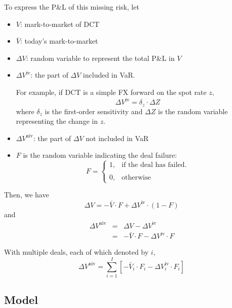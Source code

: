 \documentclass[10pt,a4paper]{article}
\newcommand{\inVaR}{{\mathrm{iv}}}
\newcommand{\notInVaR}{{\mathrm{niv}}}
\begin{document}
To express the P\&L of this missing risk, let
\begin{itemize}
	\item $V$: mark-to-market of DCT
	\item $\bar{V}$: today's mark-to-market
	\item $\Delta V$: random variable to represent the total P\&L in $V$
	\item $\Delta V^\inVaR$: the part of $\Delta V$ included in VaR. 
	
	For example, if DCT is a simple FX forward on the spot rate $z$, 
	\begin{equation}
	\Delta V^\inVaR = \delta_z \cdot \Delta Z
	\label{eqn:pnl-in-var-example}
	\end{equation}
	where $\delta_z$ is the first-order sensitivity and $\Delta Z$ is the random variable representing the change in $z$. 
	\item $\Delta V^\notInVaR$: the part of $\Delta V$ not included in VaR 
	\item $F$ is the random variable indicating the deal failure:
	\begin{equation}
	F = \left\{ 
	\begin{array}{cl}
		1, & \textrm{if the deal has failed.}\\
		\\
		0, & \textrm{otherwise}
	\end{array}
	\right.
	\end{equation}
\end{itemize}
Then, we have
\begin{equation}
\Delta V = -\bar{V} \cdot F + \Delta V^\inVaR \cdot (1 - F)
\end{equation}
and
\begin{eqnarray}
\Delta V^\notInVaR &=& \Delta V - \Delta V^\inVaR\\
& = & -\bar{V} \cdot F - \Delta V^\inVaR  \cdot F 
\end{eqnarray}

With multiple deals, each of which denoted by $i$, 
\begin{equation}
\Delta V^\notInVaR = \sum_{i=1}^{I}\left[ - \bar{V}_i \cdot F_i
- \Delta V_i^\inVaR \cdot F_i \right]
\label{eqn:missing-pnl}
\end{equation}

\subsection{Model}
\end{document}
